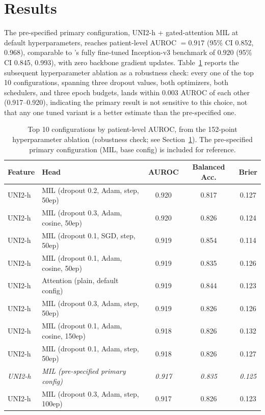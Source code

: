 \documentclass{article}
\begin{document}
\section{Results}
\label{sec:results}

The pre-specified primary configuration, UNI2-h + gated-attention MIL at default hyperparameters, reaches patient-level AUROC $=0.917$ (95\% CI 0.852, 0.968), comparable to \citet{ektefaie2021integrative}'s fully fine-tuned Inception-v3 benchmark of $0.920$ (95\% CI 0.845, 0.993), with zero backbone gradient updates. Table~\ref{tab:leaderboard} reports the subsequent hyperparameter ablation as a robustness check: every one of the top 10 configurations, spanning three dropout values, both optimizers, both schedulers, and three epoch budgets, lands within 0.003 AUROC of each other (0.917--0.920), indicating the primary result is not sensitive to this choice, not that any one tuned variant is a better estimate than the pre-specified one.

\begin{table}[h]
\caption{Top 10 configurations by patient-level AUROC, from the 152-point hyperparameter ablation (robustness check; see Section~\ref{sec:results}). The pre-specified primary configuration (MIL, base config) is included for reference.}
\label{tab:leaderboard}
\centering
\begin{tabular}{llccc}
\toprule
Feature & Head & AUROC & Balanced Acc. & Brier \\
\midrule
UNI2-h & MIL (dropout 0.2, Adam, step, 50ep)   & 0.920 & 0.817 & 0.127 \\
UNI2-h & MIL (dropout 0.3, Adam, cosine, 50ep) & 0.920 & 0.826 & 0.124 \\
UNI2-h & MIL (dropout 0.1, SGD, step, 50ep)    & 0.919 & 0.854 & 0.114 \\
UNI2-h & MIL (dropout 0.1, Adam, cosine, 50ep) & 0.919 & 0.835 & 0.126 \\
UNI2-h & Attention (plain, default config)     & 0.919 & 0.844 & 0.123 \\
UNI2-h & MIL (dropout 0.3, Adam, step, 50ep)   & 0.919 & 0.826 & 0.126 \\
UNI2-h & MIL (dropout 0.1, Adam, cosine, 150ep)& 0.918 & 0.826 & 0.132 \\
UNI2-h & MIL (dropout 0.1, Adam, step, 50ep)   & 0.918 & 0.826 & 0.127 \\
\textit{UNI2-h} & \textit{MIL (pre-specified primary config)} & \textit{0.917} & \textit{0.835} & \textit{0.125} \\
UNI2-h & MIL (dropout 0.3, Adam, step, 100ep)  & 0.917 & 0.826 & 0.123 \\
\bottomrule
\end{tabular}
\end{table}
\end{document}
